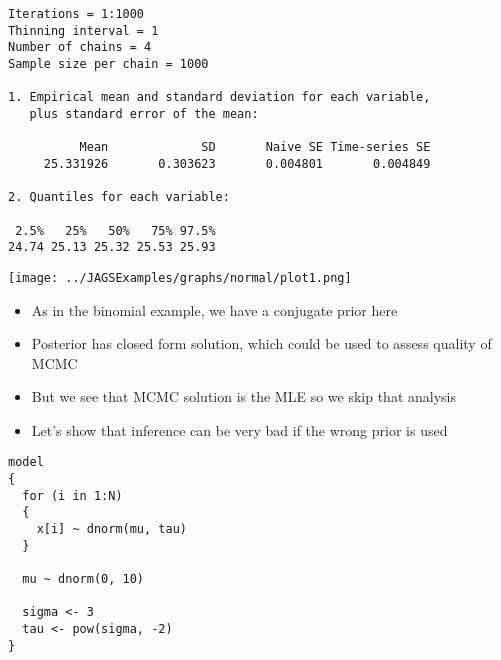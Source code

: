\documentclass{beamer}
\begin{document}
\begin{frame}[fragile]
  \begin{verbatim}
Iterations = 1:1000
Thinning interval = 1 
Number of chains = 4 
Sample size per chain = 1000 

1. Empirical mean and standard deviation for each variable,
   plus standard error of the mean:

          Mean             SD       Naive SE Time-series SE 
     25.331926       0.303623       0.004801       0.004849 

2. Quantiles for each variable:

 2.5%   25%   50%   75% 97.5% 
24.74 25.13 25.32 25.53 25.93 
  \end{verbatim}
\end{frame}

\begin{frame}[fragile]
  \begin{center}
    \texttt{[image: ../JAGSExamples/graphs/normal/plot1.png]}
  \end{center}
\end{frame}


\begin{frame}[fragile]
  \begin{itemize}
    \item{As in the binomial example, we have a conjugate prior here}
    \item{Posterior has closed form solution, which could be used to assess quality of MCMC}
    \item{But we see that MCMC solution is the MLE so we skip that analysis}
  \end{itemize}
\end{frame}

\begin{frame}[fragile]
  \begin{itemize}
    \item{Let's show that inference can be very bad if the wrong prior is used}
  \end{itemize}
\end{frame}

\begin{frame}[fragile]
  \begin{verbatim}
model
{
  for (i in 1:N)
  {
    x[i] ~ dnorm(mu, tau)
  }
  
  mu ~ dnorm(0, 10)
  
  sigma <- 3
  tau <- pow(sigma, -2)
}
  \end{verbatim}
\end{frame}
\end{document}
